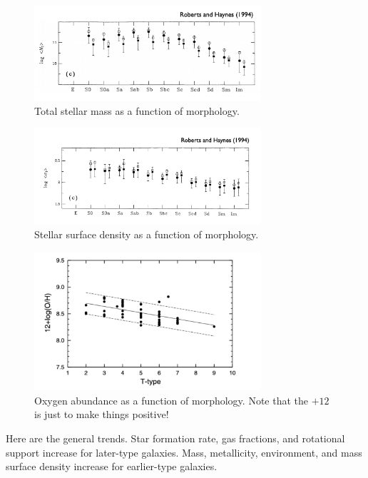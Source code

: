 \documentclass{article}
\begin{document}
\begin{figure}[ht!]
    \centering
    \includegraphics[width=0.75\textwidth]{figs/Screen Shot 2021-08-27 at 1.44.38 PM.png}
    \caption{Total stellar mass as a function of morphology. }
    \label{fig:to_mas}
\end{figure}

\begin{figure}[ht!]
    \centering
    \includegraphics[width=0.75\textwidth]{figs/Screen Shot 2021-08-27 at 1.44.48 PM.png}
    \caption{Stellar surface density as a function of morphology.}
    \label{fig:surf_dens}
\end{figure}

\begin{figure}[ht!]
    \centering
    \includegraphics[width=0.75\textwidth]{figs/Screen Shot 2021-08-27 at 1.44.59 PM.png}
    \caption{Oxygen abundance as a function of morphology. Note that the $+12$ is just to make things positive!}
    \label{fig:oxy}
\end{figure}


Here are the general trends. Star formation rate, gas fractions, and rotational support increase for later-type galaxies. Mass, metallicity, environment, and mass surface density increase for earlier-type galaxies. 
\end{document}
